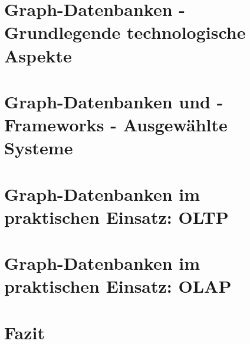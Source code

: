 \documentclass[12pt, bibliography=totoc, a4paper, abstractoff, numbers=noenddot]{scrreprt}
\begin{document}








\tableofcontents
\newpage



\setcounter{secnumdepth}{4}

\setcounter{chapter}{0}
\setcounter{section}{0}
\chapter{Graph-Datenbanken - Grundlegende technologische Aspekte}


\newpage
\setcounter{chapter}{1}
\setcounter{section}{0}
\chapter{Graph-Datenbanken und -Frameworks - Ausgewählte Systeme}


\newpage
\setcounter{chapter}{2}
\setcounter{section}{0}
\chapter{Graph-Datenbanken im praktischen Einsatz: OLTP}


\newpage
\setcounter{chapter}{3}
\setcounter{section}{0}
\chapter{Graph-Datenbanken im praktischen Einsatz: OLAP}


\newpage
\setcounter{chapter}{4}
\setcounter{section}{0}
\chapter{Fazit}


\newpage




\end{document}

